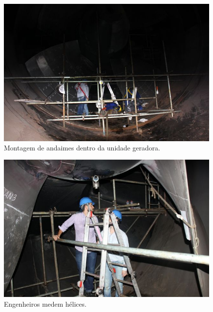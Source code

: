 \documentclass[a4paper,11pt,oneside,openany,brazilian,version=last,draft=false,]{main}
\begin{document}
\begin{twocolumn}






\begin{figure}[H]
\centering
\includegraphics[width=\columnwidth]{Fotos/img_4931.jpg}
\caption{Montagem de andaimes dentro da unidade geradora.}
\end{figure}

\begin{figure}[H]
\centering
\includegraphics[width=\columnwidth]{Fotos/img_4966.jpg}
\caption{Engenheiros medem hélices.}
\end{figure}


\end{twocolumn}
\end{document}
